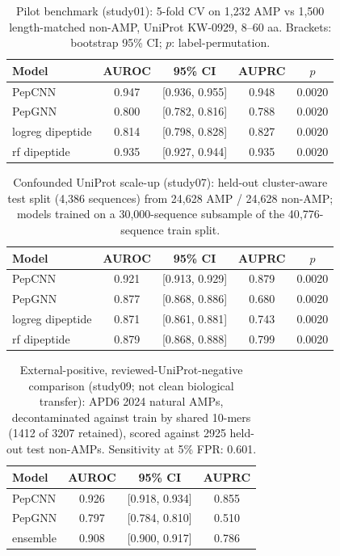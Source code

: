 \begin{table}[h]\centering\caption{Pilot benchmark (study01): 5-fold CV on 1{,}232 AMP vs 1{,}500 length-matched non-AMP, UniProt KW-0929, 8--60 aa. Brackets: bootstrap 95\% CI; $p$: label-permutation.}\label{tab:pilot}
\begin{tabular}{lcccc}\hline
Model & AUROC & 95\% CI & AUPRC & $p$ \\ \hline
PepCNN & 0.947 & [0.936, 0.955] & 0.948 & 0.0020 \\
PepGNN & 0.800 & [0.782, 0.816] & 0.788 & 0.0020 \\
logreg dipeptide & 0.814 & [0.798, 0.828] & 0.827 & 0.0020 \\
rf dipeptide & 0.935 & [0.927, 0.944] & 0.935 & 0.0020 \\
\hline\end{tabular}\end{table}
\begin{table}[h]\centering\caption{Confounded UniProt scale-up (study07): held-out cluster-aware test split (4{,}386 sequences) from 24{,}628 AMP / 24{,}628 non-AMP; models trained on a 30{,}000-sequence subsample of the 40{,}776-sequence train split.}\label{tab:scaleup}
\begin{tabular}{lcccc}\hline
Model & AUROC & 95\% CI & AUPRC & $p$ \\ \hline
PepCNN & 0.921 & [0.913, 0.929] & 0.879 & 0.0020 \\
PepGNN & 0.877 & [0.868, 0.886] & 0.680 & 0.0020 \\
logreg dipeptide & 0.871 & [0.861, 0.881] & 0.743 & 0.0020 \\
rf dipeptide & 0.879 & [0.868, 0.888] & 0.799 & 0.0020 \\
\hline\end{tabular}\end{table}
\begin{table}[h]\centering\caption{External-positive, reviewed-UniProt-negative comparison (study09; not clean biological transfer): APD6 2024 natural AMPs, decontaminated against train by shared 10-mers (1412 of 3207 retained), scored against 2925 held-out test non-AMPs. Sensitivity at 5\% FPR: 0.601.}\label{tab:apd}
\begin{tabular}{lccc}\hline
Model & AUROC & 95\% CI & AUPRC \\ \hline
PepCNN & 0.926 & [0.918, 0.934] & 0.855 \\
PepGNN & 0.797 & [0.784, 0.810] & 0.510 \\
ensemble & 0.908 & [0.900, 0.917] & 0.786 \\
\hline\end{tabular}\end{table}
